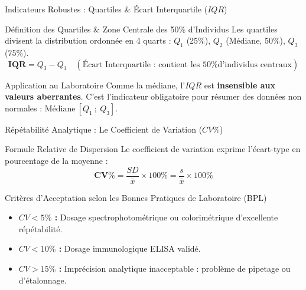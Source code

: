 \documentclass[aspectratio=169,10pt]{beamer}
\begin{document}
\begin{frame}{Indicateurs Robustes : Quartiles \& Écart Interquartile ($IQR$)}
  \begin{conceptbox}{Définition des Quartiles \& Zone Centrale des 50\% d'Individus}
    Les quartiles divisent la distribution ordonnée en 4 quarts :
    $Q_1$ (25\%), $Q_2$ (Médiane, 50\%), $Q_3$ (75\%).
    \begin{equation*}
      \mathbf{IQR} = Q_3 - Q_1 \quad (\text{Écart Interquartile : contient les 50\% d'individus centraux})
    \end{equation*}
  \end{conceptbox}
  \vspace{1.5mm}
  \begin{biobox}{Application au Laboratoire}
    Comme la médiane, l'$IQR$ est \textbf{insensible aux valeurs aberrantes}. C'est l'indicateur obligatoire pour résumer des données non normales : $\text{Médiane} \ [Q_1 \ ; \ Q_3]$.
  \end{biobox}
\end{frame}

\begin{frame}{Répétabilité Analytique : Le Coefficient de Variation ($CV\%$)}
  \begin{conceptbox}{Formule Relative de Dispersion}
    Le coefficient de variation exprime l'écart-type en pourcentage de la moyenne :
    \begin{equation*}
      \mathbf{CV\%} = \frac{SD}{\bar{x}} \times 100\% = \frac{s}{\bar{x}} \times 100\%
    \end{equation*}
  \end{conceptbox}
  \vspace{1.5mm}
  \begin{biobox}{Critères d'Acceptation selon les Bonnes Pratiques de Laboratoire (BPL)}
    \begin{itemize}\setlength{\itemsep}{1.5pt}
      \item \textbf{$CV < 5\%$ :} Dosage spectrophotométrique ou colorimétrique d'excellente répétabilité.
      \item \textbf{$CV < 10\%$ :} Dosage immunologique ELISA validé.
      \item \textbf{$CV > 15\%$ :} Imprécision analytique inacceptable : problème de pipetage ou d'étalonnage.
    \end{itemize}
  \end{biobox}
\end{frame}
\end{document}
